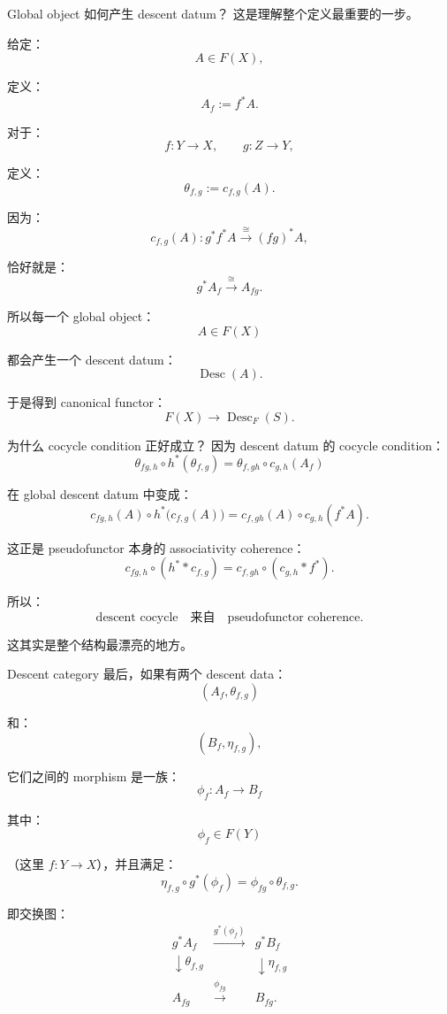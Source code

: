 \documentclass{beamer}
\begin{document}
\begin{frame}{Global object 如何产生 descent datum？}
这是理解整个定义最重要的一步。

给定：
$$
A\in F(X),
$$

定义：
$$
\boxed{
A_f:=f^*A.
}
$$

对于：
$$
f:Y\to X,
\qquad
g:Z\to Y,
$$

定义：
$$
\boxed{
\theta_{f,g}:=c_{f,g}(A).
}
$$

因为：
$$
c_{f,g}(A):
g^*f^*A
\overset{\cong}{\longrightarrow}
(fg)^*A,
$$

恰好就是：
$$
g^*A_f
\overset{\cong}{\longrightarrow}
A_{fg}.
$$

所以每一个 global object：
$$
A\in F(X)
$$

都会产生一个 descent datum：
$$
\boxed{
\operatorname{Desc}(A).
}
$$

于是得到 canonical functor：
$$
\boxed{
F(X)
\longrightarrow
\operatorname{Desc}_F(S).
}
$$
\end{frame}

\begin{frame}[fragile]{为什么 cocycle condition 正好成立？}
因为 descent datum 的 cocycle condition：
$$
\theta_{fg,h}
\circ
h^*(\theta_{f,g})
=
\theta_{f,gh}
\circ
c_{g,h}(A_f)
$$

在 global descent datum 中变成：
$$
c_{fg,h}(A)
\circ
h^*\bigl(c_{f,g}(A)\bigr)
=
c_{f,gh}(A)
\circ
c_{g,h}(f^*A).
$$

这正是 pseudofunctor 本身的 associativity coherence：
$$
\boxed{
c_{fg,h}\circ(h^**c_{f,g})
=
c_{f,gh}\circ(c_{g,h}*f^*).
}
$$

所以：
$$
\boxed{
\text{descent cocycle}
\quad\text{来自}\quad
\text{pseudofunctor coherence}.
}
$$

这其实是整个结构最漂亮的地方。
\end{frame}

\begin{frame}{Descent category}
最后，如果有两个 descent data：
$$
(A_f,\theta_{f,g})
$$

和：
$$
(B_f,\eta_{f,g}),
$$

它们之间的 morphism 是一族：
$$
\boxed{
\phi_f:A_f\to B_f
}
$$

其中：
$$
\phi_f\in F(Y)
$$

（这里 \(f:Y\to X\)），并且满足：
$$
\boxed{
\eta_{f,g}
\circ
g^*(\phi_f)
=
\phi_{fg}
\circ
\theta_{f,g}.
}
$$

即交换图：
$$
\boxed{
\begin{array}{ccc}
g^*A_f
&
\xrightarrow{g^*(\phi_f)}
&
g^*B_f
\\[2mm]
\downarrow{\theta_{f,g}}
&&
\downarrow{\eta_{f,g}}
\\[2mm]
A_{fg}
&
\xrightarrow{\phi_{fg}}
&
B_{fg}.
\end{array}
}
$$
\end{frame}
\end{document}

